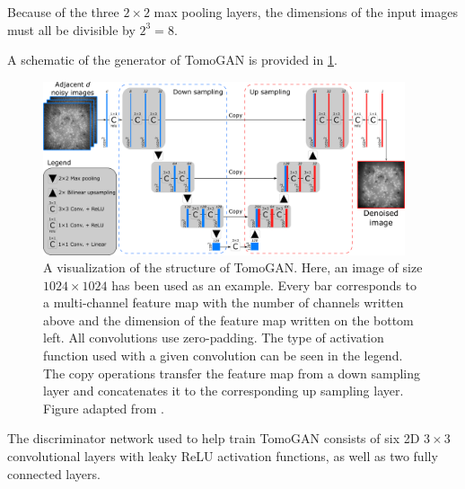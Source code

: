 Because of the three $2\times2$ max pooling layers, the dimensions of the input images must all be divisible by $2^3=8$. 

A schematic of the generator of TomoGAN is provided in \cref{fig:tomoganstructure}.

\begin{figure}[htbp]
    \centering
    \includegraphics[width=0.95\textwidth]{figures/tomoganstructure.png}
    \caption[Visualization of the structure of TomoGAN]{A visualization of the structure of TomoGAN. Here, an image of size $1024\times1024$ has been used as an example. Every bar corresponds to a multi-channel feature map with the number of channels written above and the dimension of the feature map written on the bottom left. All convolutions use zero-padding. The type of activation function used with a given convolution can be seen in the legend. The copy operations transfer the feature map from a down sampling layer and concatenates it to the corresponding up sampling layer. Figure adapted from \cite{liu2020tomogan}. } 
    \label{fig:tomoganstructure}
\end{figure}

The discriminator network used to help train TomoGAN consists of six 2D $3\times3$ convolutional layers with leaky ReLU activation functions, as well as two fully connected layers. 

